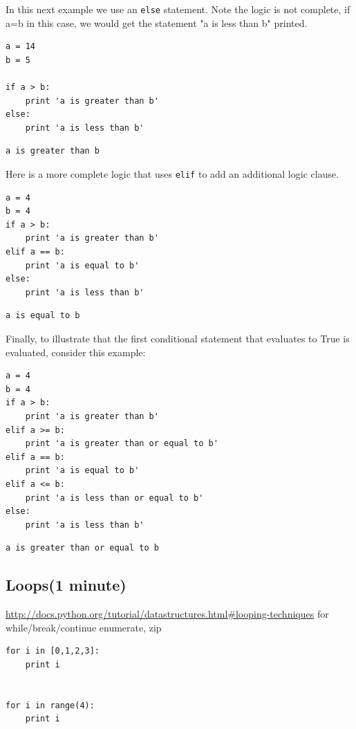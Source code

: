 \documentclass[11pt]{article}
\begin{document}
In this next example we use an \texttt{else} statement. Note the logic is not complete, if a=b in this case, we would get the statement "a is less than b" printed.
\begin{verbatim}
a = 14
b = 5

if a > b:
    print 'a is greater than b'
else:
    print 'a is less than b'
\end{verbatim}

\begin{verbatim}
a is greater than b
\end{verbatim}

Here is a more complete logic that uses \texttt{elif} to add an additional logic clause.
\begin{verbatim}
a = 4
b = 4
if a > b:
    print 'a is greater than b'
elif a == b:
    print 'a is equal to b'
else:
    print 'a is less than b'
\end{verbatim}

\begin{verbatim}
a is equal to b
\end{verbatim}

Finally, to illustrate that the first conditional statement that evaluates to True is evaluated, consider this example:
\begin{verbatim}
a = 4
b = 4
if a > b:
    print 'a is greater than b'
elif a >= b:
    print 'a is greater than or equal to b'
elif a == b:
    print 'a is equal to b'
elif a <= b:
    print 'a is less than or equal to b'
else:
    print 'a is less than b'
\end{verbatim}

\begin{verbatim}
a is greater than or equal to b
\end{verbatim}


\subsection{Loops(1 minute)}
\label{sec-3-5}
\url{http://docs.python.org/tutorial/datastructures.html#looping-techniques}
for
while/break/continue
enumerate, zip

\begin{verbatim}
for i in [0,1,2,3]:
    print i


for i in range(4):
    print i
\end{verbatim}
\end{document}
